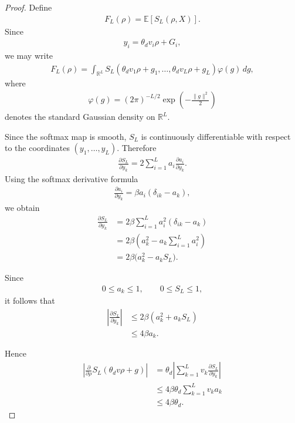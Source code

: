 \documentclass[11pt,a4paper]{article}
\theoremstyle{definition}
\begin{document}
\begin{proof}
Define
\begin{align}
F_L(\rho)
=
\mathbb E[S_L(\rho,X)].
\end{align}
Since
\begin{align}
y_i
=
\theta_d v_i\rho+G_i,
\end{align}
we may write
\begin{align}
F_L(\rho)
=
\int_{\mathbb R^L}
S_L(\theta_d v_1\rho+g_1,\ldots,
\theta_d v_L\rho+g_L)
\varphi(g)\,dg,
\end{align}
where
\begin{align}
\varphi(g)
=
(2\pi)^{-L/2}
\exp\!\left(
-\frac{\|g\|^2}{2}
\right)
\end{align}
denotes the standard Gaussian density on $\mathbb R^L$.

Since the softmax map is smooth, $S_L$ is continuously differentiable with respect to the coordinates $(y_1,\ldots,y_L)$. Therefore
\begin{align}
\frac{\partial S_L}{\partial y_k}
=
2\sum_{i=1}^{L}
a_i
\frac{\partial a_i}{\partial y_k}.
\end{align}
Using the softmax derivative formula
\begin{align}
\frac{\partial a_i}{\partial y_k}
=
\beta a_i
(\delta_{ik}-a_k),
\end{align}
we obtain
\begin{align}
\frac{\partial S_L}{\partial y_k}
&=
2\beta
\sum_{i=1}^{L}
a_i^2
(\delta_{ik}-a_k)
\\
&=
2\beta
\left(
a_k^2
-
a_k
\sum_{i=1}^{L}a_i^2
\right)
\\
&=
2\beta
\bigl(
a_k^2-a_kS_L
\bigr).
\end{align}

Since
\begin{align}
0\le a_k\le 1,
\qquad
0\le S_L\le 1,
\end{align}
it follows that
\begin{align}
\left|
\frac{\partial S_L}{\partial y_k}
\right|
&\le
2\beta
\left(
a_k^2+a_kS_L
\right)
\\
&\le
4\beta a_k.
\end{align}

Hence
\begin{align}
\left|
\frac{\partial}{\partial\rho}
S_L(\theta_d v\rho+g)
\right|
&=
\theta_d
\left|
\sum_{k=1}^{L}
v_k
\frac{\partial S_L}{\partial y_k}
\right|
\\
&\le
4\beta\theta_d
\sum_{k=1}^{L}
v_k a_k
\\
&\le
4\beta\theta_d.
\end{align}


\end{proof}
\end{document}
